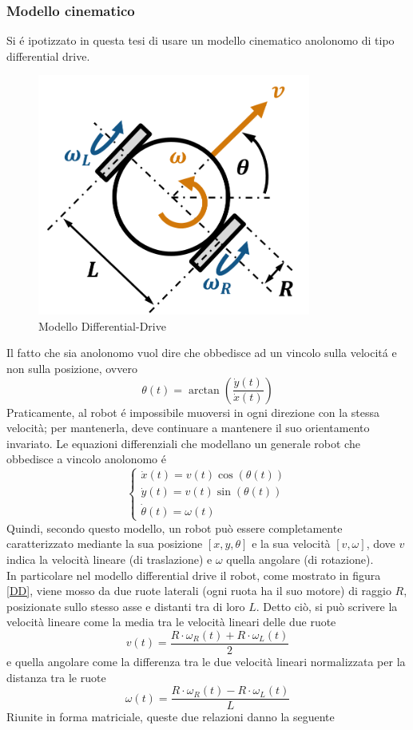 \documentclass[14pt,a4paper]{extarticle}
\begin{document}
\subsubsection{Modello cinematico}
Si é ipotizzato in questa tesi di usare un modello cinematico anolonomo di tipo differential drive. 
\begin{figure}[H]
\centering
\caption{Modello Differential-Drive \cite{toolbox}} \label{dd}
\includegraphics[width=0.8\textwidth]{DD.png}
\end{figure}
Il fatto che sia anolonomo vuol dire che obbedisce ad un vincolo sulla velocitá e non sulla posizione, ovvero \[\theta(t) = \arctan \left( \frac{\dot{y}(t)}{\dot{x}(t)} \right) \] Praticamente, al robot é impossibile muoversi in ogni direzione con la stessa velocità; per mantenerla, deve continuare a mantenere il suo orientamento invariato. Le equazioni differenziali che modellano un generale robot che obbedisce a vincolo anolonomo é
\begin{equation}
\label{anolomeq}
\begin{cases}
\dot{x}(t) = v(t)\cos(\theta(t)) \\
\dot{y}(t) = v(t)\sin(\theta(t)) \\
\dot{\theta}(t) = \omega(t)
\end{cases}
\end{equation} 
Quindi, secondo questo modello, un robot può essere completamente caratterizzato mediante la sua posizione \([x,y,\theta]\) e la sua velocità \([v,\omega]\), dove \(v\) indica la velocità lineare (di traslazione) e \(\omega\) quella angolare (di rotazione).\\
In particolare nel modello differential drive il robot, come mostrato in figura \ref{DD}, viene mosso da due ruote laterali (ogni ruota ha il suo motore) di raggio \(R\), posizionate sullo stesso asse e distanti tra di loro \(L\). Detto ciò, si può scrivere la velocità lineare come la media tra le velocità lineari delle due ruote \[v(t)=\frac{R\cdot\omega_R(t)+R\cdot\omega_L(t)}{2}\] e quella angolare come la differenza tra le due velocità lineari normalizzata per la distanza tra le ruote \[\omega(t)=\frac{R\cdot\omega_R(t)-R\cdot\omega_L(t)}{L}\] Riunite in forma matriciale, queste due relazioni danno la seguente
\end{document}
